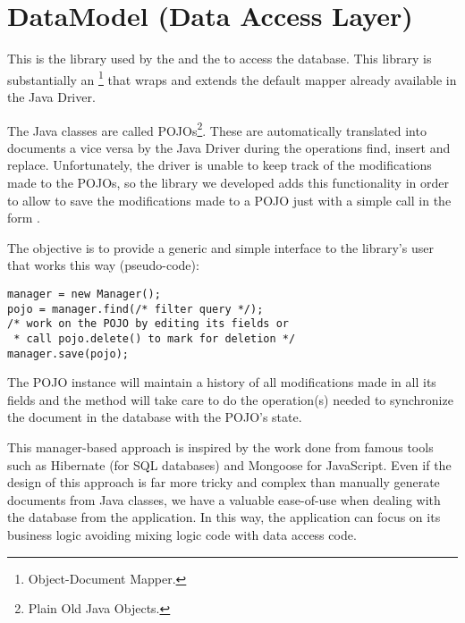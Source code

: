 \section{DataModel (Data Access Layer)}\label{sec:datamodel}

This is the library used by the  and the  to access
the database. This library is substantially an
\footnote{Object-Document Mapper.} that wraps and extends the
default mapper already available in the \mongodb{} Java Driver.

The Java classes are called POJOs\footnote{Plain Old Java Objects.}. These are
automatically translated into documents a vice versa by the \mongodb{} Java
Driver during the operations find, insert and replace. Unfortunately, the driver
is unable to keep track of the modifications made to the POJOs, so the library
we developed adds this functionality in order to allow to save the modifications
made to a POJO just with a simple call in the form .

The objective is to provide a generic and simple interface to the library's
user that works this way (pseudo-code):
\begin{verbatim}
manager = new Manager();
pojo = manager.find(/* filter query */);
/* work on the POJO by editing its fields or
 * call pojo.delete() to mark for deletion */
manager.save(pojo);
\end{verbatim}
The POJO instance will maintain a history of all modifications made in all its
fields and the  method will take care to do the
operation(s) needed to synchronize the document in the database with the POJO's
state.

This manager-based approach is inspired by the work done from famous tools such
as Hibernate (for SQL databases) and Mongoose for JavaScript. Even if the design
of this approach is far more tricky and complex than manually generate documents
from Java classes, we have a valuable ease-of-use when dealing with the database
from the application. In this way, the application can focus on its business
logic avoiding mixing logic code with data access code.


